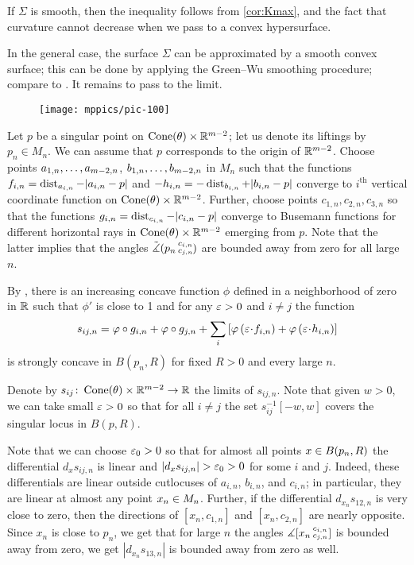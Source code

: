  If $\Sigma$ is smooth, then the inequality follows from \ref{cor:Kmax}, and the fact that curvature cannot decrease when we pass to a convex hypersurface.

In the general case, the surface $\Sigma$ can be approximated by a smooth convex surface;
this can be done by applying the Green--Wu smoothing procedure; compare to \cite{AKP-buyalo}.
It remains to pass to the limit.
\qeds

\begin{wrapfigure}{r}{35 mm}
\vskip-0mm
\centering
\texttt{[image: mppics/pic-100]}
\vskip0mm
\end{wrapfigure}

Let $p$ be a singular point on $\operatorname{Cone}(\theta)\times \mathbb{R}^{m-2}$;
let us denote its liftings by $p_n\in M_n$.
We can assume that $p$ corresponds to the origin of $\mathbb{R}^{m-2}$.
Choose points $a_{1,n},\zz\dots,a_{m-2,n}$, $b_{1,n},\zz\dots,b_{m-2,n}$ in $M_n$ such that the functions $f_{i,n}\zz=\dist_{a_{i,n}}\zz-|a_{i,n}-p|$ and $-h_{i,n}\zz=-\dist_{b_{i,n}}+|b_{i,n}-p|$ converge to $i^{\text{th}}$ vertical coordinate function on $\Cone(\theta)\zz\times \RR^{m-2}$.
Further, choose points $c_{1,n},c_{2,n},c_{3,n}$ so that the functions $g_{i,n}\zz=\dist_{c_{i,n}}-|c_{i,n}-p|$ converge to Busemann functions for different horizontal rays in $\operatorname{Cone}(\theta)\times \mathbb{R}^{m-2}$ emerging from $p$.
Note that the latter implies that the angles $\tilde\measuredangle(p_n\,{}^{c_{i,n}}_{c_{j,n}}\hspace{-0.2ex})$ are bounded away from zero for all large~$n$.

By \cite[Lemma 7.2.1]{petrunin-conc}, there is an increasing concave function $\phi$ defined in a neighborhood of zero in $\mathbb{R}$ such that $\phi'$ is close to 1 and for any $\varepsilon>0$ and $i\ne j$ the function 
\[s_{ij,n}
=
\phi\circ g_{i,n}
+
\phi\circ g_{j,n}
+
\sum_i\left[\phi\left(\eps\cdot f_{i,n}\right)+\phi\left(\eps\cdot h_{i,n}\right)\right]\]
is strongly concave in $B(p_n,R)$ for fixed $R>0$ and every large $n$.

Denote by $s_{ij}\:\Cone(\theta)\zz\times \RR^{m-2}\zz\to \RR$ the limits of $s_{ij,n}$.
Note that given $w>0$, we can take small $\varepsilon>0$ so that for all $i\ne j$ the set $s_{ij}^{-1}[-w,w]$ covers the singular locus in $B(p,R)$. 

Note that we can choose $\varepsilon_0>0$ so that for almost all points $x\zz\in B(p_n,R)$ 
the differential $d_xs_{ij,n}$ is linear and $|d_xs_{ij,n}|>\eps_0>0$ for some $i$ and $j$.
Indeed, these differentials are linear outside cutlocuses of $a_{i,n}$, $b_{i,n}$, and $c_{i,n}$;
in particular, they are linear at almost any point $x_n\zz\in M_n$.
Further, if the differential $d_{x_n}s_{12,n}$ is very close to zero,
then the directions of $[x_n,c_{1,n}]$ and $[x_n,c_{2,n}]$ are nearly opposite.
Since $x_n$ is close to $p_n$, we get that for large $n$ the angles $\measuredangle[x_n\,{}^{c_{i,n}}_{c_{j,n}}]$ is bounded away from zero, we get $|d_{x_n}s_{13,n}|$ is bounded away from zero as well.

